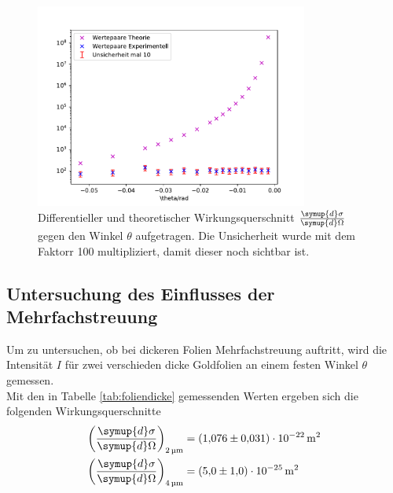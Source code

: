 \begin{figure}
    \centering
    \includegraphics[width=0.8\textwidth]{data/plots/Rutherford.pdf}
    \caption{Differentieller und theoretischer Wirkungsquerschnitt $\frac{\symup{d}\sigma}{\symup{d}\Omega}$ gegen den Winkel $\theta$ aufgetragen. Die Unsicherheit wurde mit dem Faktorr 100 multipliziert, damit dieser noch sichtbar ist.}
\end{figure}

\subsection{Untersuchung des Einflusses der Mehrfachstreuung}
Um zu untersuchen, ob bei dickeren Folien Mehrfachstreuung auftritt, wird die Intensität $I$ für zwei verschieden dicke Goldfolien an einem festen Winkel $\theta$ gemessen. \\
Mit den in Tabelle \ref{tab:foliendicke} gemessenden Werten ergeben sich die folgenden Wirkungsquerschnitte
\begin{align*}
    \left(\frac{\symup{d}\sigma}{\symup{d}\Omega}\right)_\text{\SI{2}{\micro \meter}} &= \SI{1,076(31)e-22}{\meter}^2 \\
    \left(\frac{\symup{d}\sigma}{\symup{d}\Omega}\right)_\text{\SI{4}{\micro \meter}} &= \SI{5,0(10)e-25}{\meter}^2
\end{align*} 


